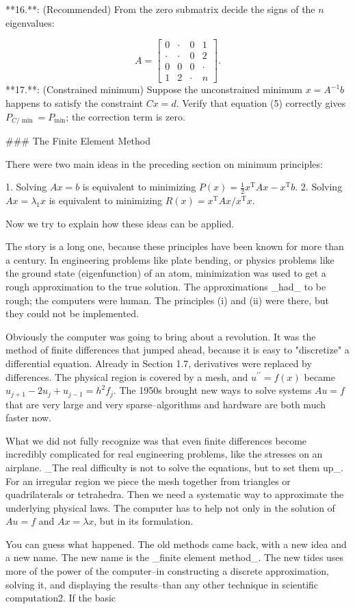

**16.**: (Recommended) From the zero submatrix decide the signs of the \(n\) eigenvalues:

\[A=\begin{bmatrix}0&\cdot&0&1\\ \cdot&\cdot&0&2\\ 0&0&0&\cdot\\ 1&2&\cdot&n\end{bmatrix}.\]
**17.**: (Constrained minimum) Suppose the unconstrained minimum \(x=A^{-1}b\) happens to satisfy the constraint \(Cx=d\). Verify that equation (5) correctly gives \(P_{C/\min}=P_{\min}\); the correction term is zero.

### The Finite Element Method

There were two main ideas in the preceding section on minimum principles:

1. Solving \(Ax=b\) is equivalent to minimizing \(P(x)=\frac{1}{2}x^{\mathrm{T}}Ax-x^{\mathrm{T}}b\).
2. Solving \(Ax=\lambda_{1}x\) is equivalent to minimizing \(R(x)=x^{\mathrm{T}}Ax/x^{\mathrm{T}}x\).

Now we try to explain how these ideas can be applied.

The story is a long one, because these principles have been known for more than a century. In engineering problems like plate bending, or physics problems like the ground state (eigenfunction) of an atom, minimization was used to get a rough approximation to the true solution. The approximations _had_ to be rough; the computers were human. The principles (i) and (ii) were there, but they could not be implemented.

Obviously the computer was going to bring about a revolution. It was the method of finite differences that jumped ahead, because it is easy to "discretize" a differential equation. Already in Section 1.7, derivatives were replaced by differences. The physical region is covered by a mesh, and \(u^{\prime\prime}=f(x)\) became \(u_{j+1}-2u_{j}+u_{j-1}=h^{2}f_{j}\). The 1950s brought new ways to solve systems \(Au=f\) that are very large and very sparse--algorithms and hardware are both much faster now.

What we did not fully recognize was that even finite differences become incredibly complicated for real engineering problems, like the stresses on an airplane. _The real difficulty is not to solve the equations, but to set them up_. For an irregular region we piece the mesh together from triangles or quadrilaterals or tetrahedra. Then we need a systematic way to approximate the underlying physical laws. The computer has to help not only in the solution of \(Au=f\) and \(Ax=\lambda x\), but in its formulation.

You can guess what happened. The old methods came back, with a new idea and a new name. The new name is the _finite element method_. The new tides uses more of the power of the computer--in constructing a discrete approximation, solving it, and displaying the results--than any other technique in scientific computation2. If the basic